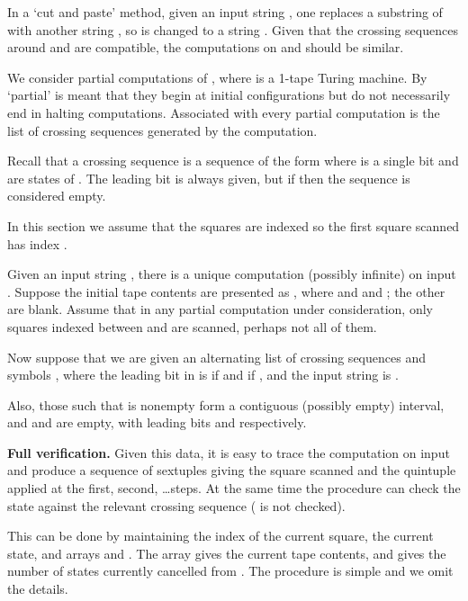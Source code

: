 \def\labelitemii{}
\newcommand{\next}{N}
\newcommand{\nextstate}{{\mbox{\rm Nustate}}}


In a
`cut and paste' method, given an input string ,
one replaces a substring  of  with another
string , so  is changed to a string .
Given that the crossing sequences around  and 
are compatible, the computations on  and  should be similar.


We consider partial computations of ,
where  is a 1-tape Turing machine.
By `partial' is meant that they begin at initial configurations
but do not necessarily end in halting computations.
Associated with every partial computation
is the list of crossing sequences generated by
the computation.

Recall that a crossing sequence is a sequence of the form
 where  is a single bit
and  are states of .  The leading bit
is always given, but if  then the sequence is considered empty.

In this section we assume that the squares are indexed
so the first square scanned has index .

\numpara
\label{par: alternating list}
Given an input string ,
there is a unique computation (possibly infinite) on input .
Suppose the initial tape contents are presented as
, where 
and  and ;
the other  are blank.
Assume that in any partial computation under consideration,
only squares indexed between  and  are
scanned, perhaps not all of them.

\numpara
\label{par: specification}
Now suppose that we are given an alternating list
of crossing sequences  and symbols ,
 where
the leading bit in  is  if  and  if ,
and the input string  is .

Also, those  such that  is nonempty
form a contiguous (possibly empty) interval,
and  and  are empty, with leading
bits  and  respectively.

\numpara
\label{par: full verification}
{\bf Full verification.}
Given this data, it is easy to trace the computation
on input  and produce a sequence of sextuples
 giving the square scanned
and the quintuple applied at the first, second, \ldots steps.
At the same time the procedure can check the state  against
the relevant crossing sequence ( is not checked).

This can be done by maintaining
the index of the current square, the current state,
and arrays  and .
The array  gives the current tape contents, and
 gives the number of states currently cancelled from
. The procedure is simple and we omit the details.

